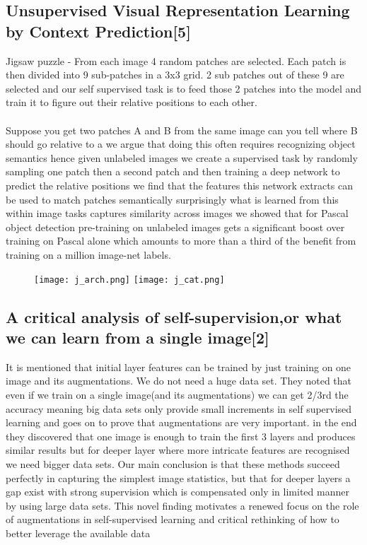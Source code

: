 \documentclass[a4paper, 12pt]{article}
\begin{document}
\subsection{Unsupervised Visual Representation Learning by Context Prediction[5]}
\hspace{1cm}
Jigsaw puzzle - From each image 4 random patches are selected. Each patch is then divided into 9 sub-patches in a 3x3 grid. 2 sub patches out of these 9 are selected and our self supervised task is to feed those 2 patches into the model and train it to figure out their relative positions to each other.\\
\\
Suppose you get two patches A and B from
the same image can you tell where B
should go relative to a we argue that
doing this often requires recognizing
object semantics hence given unlabeled
images we create a supervised task by
randomly sampling one patch then a
second patch and then training a deep
network to predict the relative
positions we find that the features this
network extracts can be used to match
patches semantically surprisingly what
is learned from this within image tasks
captures similarity across images we
showed that for Pascal object detection
pre-training on unlabeled images gets a
significant boost over training on
Pascal alone which amounts to more than
a third of the benefit from training on
a million image-net labels.\\

\begin{figure}[htp]
    \centering
    \texttt{[image: j\_arch.png]}
    \texttt{[image: j\_cat.png]}
    
\end{figure}


\subsection{A critical analysis of self-supervision,or what we can learn from a single image[2]}
\hspace{1cm}
It is mentioned that initial layer features can be trained by just training on one image and its augmentations. We do not need a huge data set. They noted that even if we train on a single image(and its augmentations) we can get 2/3rd the accuracy meaning big data sets only provide small increments in self supervised learning and goes on to prove that augmentations are very important. in the end they discovered that one image is enough to train the first 3 layers and produces similar results but for deeper layer where more intricate features are recognised we need bigger data sets. Our main conclusion is that these methods succeed perfectly in capturing the simplest image statistics, but that for deeper layers a gap exist with strong
supervision which is compensated only in limited manner by using large data sets. This novel finding
motivates a renewed focus on the role of augmentations in self-supervised learning and critical
rethinking of how to better leverage the available data
\end{document}
